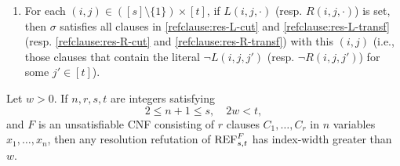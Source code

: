 \begin{definition}
\begin{enumerate}[({A}1)]
\item \label{item:admissible-RL-cut-variable_and_RL-transf} For each $(i, j) \in ([s] \setminus \{1\}) \times [t]$, if $L(i,j,\cdot )$ (resp. $R(i,j,\cdot )$) is set, then $\sigma$ satisfies all clauses in \eqref{refclause:res-L-cut} and \eqref{refclause:res-L-transf} (resp. \eqref{refclause:res-R-cut} and \eqref{refclause:res-R-transf}) with this $(i,j)$ (i.e., those clauses that contain the literal $\neg L(i,j,j')$ (resp. $\neg R(i,j,j')$) for some $j' \in [t]$).
\end{enumerate}
\end{definition}



\begin{theorem}
\label{thm:width_lb}
Let $w>0$. If $n,r,s,t$ are integers satisfying 
\begin{equation}
\label{eq:conditions_on_n,r,s,t,w_in_width_lb_theorem} 
2 \leq n+1 \leq s, \quad 2w < t,
\end{equation}
and $F$ is an unsatisfiable CNF consisting of $r$ clauses $C_1,\ldots, C_r$ in $n$ variables $x_1,\ldots, x_n$, then any resolution refutation of $\textnormal{REF}^{F}_{s,t}$ has index-width greater than $w$.
\end{theorem}
 
